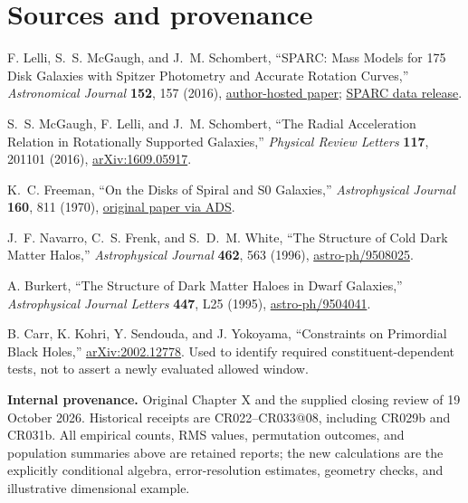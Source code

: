 \section{Sources and provenance}
\begin{enumerate}[label={[X.\arabic*]}]
\item F. Lelli, S.~S. McGaugh, and J.~M. Schombert, ``SPARC: Mass Models for 175 Disk Galaxies with Spitzer Photometry and Accurate Rotation Curves,'' \emph{Astronomical Journal} \textbf{152}, 157 (2016), \href{https://astroweb.case.edu/ssm/papers/AJv152n157.pdf}{author-hosted paper}; \href{https://astroweb.case.edu/SPARC/}{SPARC data release}.
\item S.~S. McGaugh, F. Lelli, and J.~M. Schombert, ``The Radial Acceleration Relation in Rotationally Supported Galaxies,'' \emph{Physical Review Letters} \textbf{117}, 201101 (2016), \href{https://arxiv.org/abs/1609.05917}{arXiv:1609.05917}.
\item K.~C. Freeman, ``On the Disks of Spiral and S0 Galaxies,'' \emph{Astrophysical Journal} \textbf{160}, 811 (1970), \href{https://adsabs.harvard.edu/pdf/1970ApJ...160..811F}{original paper via ADS}.
\item J.~F. Navarro, C.~S. Frenk, and S.~D.~M. White, ``The Structure of Cold Dark Matter Halos,'' \emph{Astrophysical Journal} \textbf{462}, 563 (1996), \href{https://arxiv.org/abs/astro-ph/9508025}{astro-ph/9508025}.
\item A. Burkert, ``The Structure of Dark Matter Haloes in Dwarf Galaxies,'' \emph{Astrophysical Journal Letters} \textbf{447}, L25 (1995), \href{https://arxiv.org/abs/astro-ph/9504041}{astro-ph/9504041}.
\item B. Carr, K. Kohri, Y. Sendouda, and J. Yokoyama, ``Constraints on Primordial Black Holes,'' \href{https://arxiv.org/abs/2002.12778}{arXiv:2002.12778}. Used to identify required constituent-dependent tests, not to assert a newly evaluated allowed window.
\end{enumerate}

\noindent\textbf{Internal provenance.} Original Chapter X and the supplied closing review of 19 October 2026. Historical receipts are CR022--CR033@08, including CR029b and CR031b. All empirical counts, RMS values, permutation outcomes, and population summaries above are retained reports; the new calculations are the explicitly conditional algebra, error-resolution estimates, geometry checks, and illustrative dimensional example.
